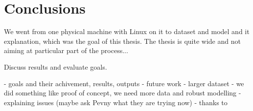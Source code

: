 \chapter{Conclusions}

We went from one physical machine with Linux on it to dataset and model and it explanation, which was the goal of this thesis. The thesis is quite wide and not aiming at particular part of the process...

Discuss results and evaluate goals.

- goals and their achivement, results, outputs
- future work
    - larger dataset
    - we did something like proof of concept, we need more data and robust modelling
    - explaining issues (maybe ask Pevny what they are trying now)
- thanks to